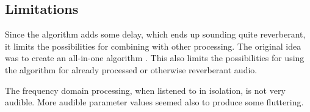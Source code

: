 \subsection{Limitations}
Since the algorithm adds some delay, which ends up sounding quite reverberant, it limits the possibilities for combining with other processing. The original idea was to create an all-in-one algorithm \cite{dudas}. This also limits the possibilities for using the algorithm for already processed or otherwise reverberant audio.

The frequency domain processing, when listened to in isolation, is not very audible. More audible parameter values seemed also to produce some fluttering.
